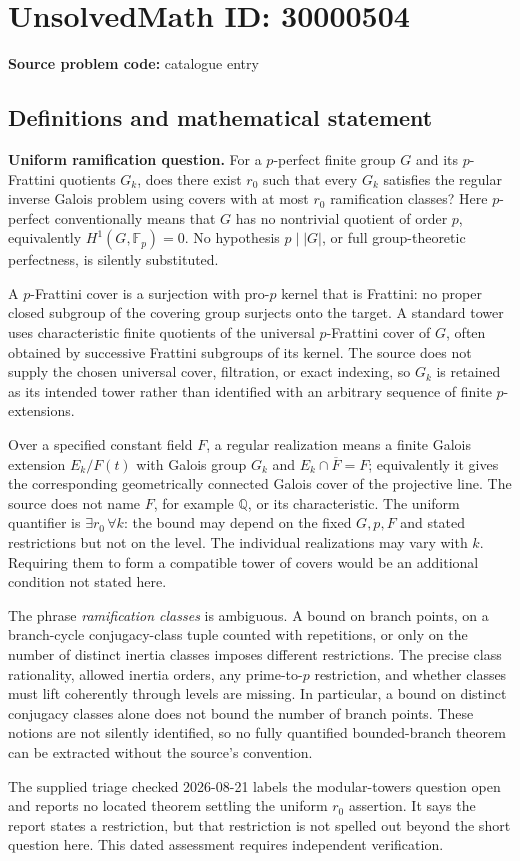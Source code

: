 \documentclass[11pt]{article}
\newcommand{\Q}{\mathbb{Q}}
\newcommand{\F}{\mathbb{F}}
\begin{document}
\section*{UnsolvedMath ID: 30000504}
\textbf{Source problem code:} catalogue entry
\subsection{Definitions and mathematical statement}
\textbf{Uniform ramification question.} For a \(p\)-perfect finite group \(G\) and its \(p\)-Frattini quotients \(G_k\), does there exist \(r_0\) such that every \(G_k\) satisfies the regular inverse Galois problem using covers with at most \(r_0\) ramification classes? Here \(p\)-perfect conventionally means that \(G\) has no nontrivial quotient of order \(p\), equivalently \(H^1(G,\F_p)=0\). No hypothesis \(p\mid|G|\), or full group-theoretic perfectness, is silently substituted.\par A \(p\)-Frattini cover is a surjection with pro-\(p\) kernel that is Frattini: no proper closed subgroup of the covering group surjects onto the target. A standard tower uses characteristic finite quotients of the universal \(p\)-Frattini cover of \(G\), often obtained by successive Frattini subgroups of its kernel. The source does not supply the chosen universal cover, filtration, or exact indexing, so \(G_k\) is retained as its intended tower rather than identified with an arbitrary sequence of finite \(p\)-extensions.\par Over a specified constant field \(F\), a regular realization means a finite Galois extension \(E_k/F(t)\) with Galois group \(G_k\) and \(E_k\cap\overline F=F\); equivalently it gives the corresponding geometrically connected Galois cover of the projective line. The source does not name \(F\), for example \(\Q\), or its characteristic. The uniform quantifier is \(\exists r_0\,\forall k\): the bound may depend on the fixed \(G,p,F\) and stated restrictions but not on the level. The individual realizations may vary with \(k\). Requiring them to form a compatible tower of covers would be an additional condition not stated here.\par The phrase \emph{ramification classes} is ambiguous. A bound on branch points, on a branch-cycle conjugacy-class tuple counted with repetitions, or only on the number of distinct inertia classes imposes different restrictions. The precise class rationality, allowed inertia orders, any prime-to-\(p\) restriction, and whether classes must lift coherently through levels are missing. In particular, a bound on distinct conjugacy classes alone does not bound the number of branch points. These notions are not silently identified, so no fully quantified bounded-branch theorem can be extracted without the source's convention.\par The supplied triage checked 2026-08-21 labels the modular-towers question open and reports no located theorem settling the uniform \(r_0\) assertion. It says the report states a restriction, but that restriction is not spelled out beyond the short question here. This dated assessment requires independent verification.
\end{document}
